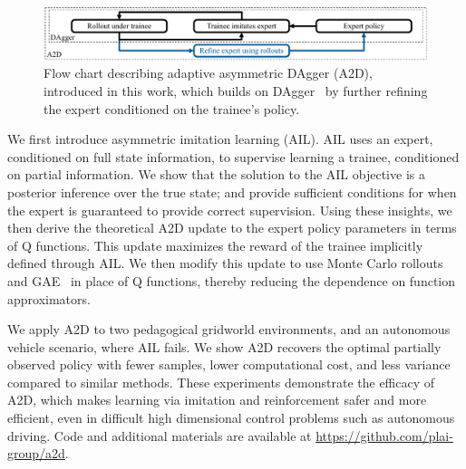 \begin{figure}
    \centering
    \includegraphics[width=\textwidth]{figures/ad_vs_a2d_super_simple.pdf}
    \vspace*{-0.3cm}
    \caption{Flow chart describing adaptive asymmetric DAgger (A2D), introduced in this work, which builds on DAgger~\citep{Ross2011} by further refining the expert conditioned on the trainee's policy. }
    \label{fig:a2d}
\end{figure}

We first introduce asymmetric imitation learning (AIL).  AIL uses an expert, conditioned on full state information, to supervise learning a trainee, conditioned on partial information.  We show that the solution to the AIL objective is a posterior inference over the true state; and provide sufficient conditions for when the expert is guaranteed to provide correct supervision.  Using these insights, we then derive the theoretical A2D update to the expert policy parameters in terms of Q functions.  This update maximizes the reward of the trainee implicitly defined through AIL.  We then modify this update to use Monte Carlo rollouts and GAE~\citep{schulman2015high} in place of Q functions, thereby reducing the dependence on function approximators. 

We apply A2D to two pedagogical gridworld environments, and an autonomous vehicle scenario, where AIL fails. We show A2D recovers the optimal partially observed policy with fewer samples, lower computational cost, and less variance compared to similar methods.  These experiments demonstrate the efficacy of A2D, which makes learning via imitation and reinforcement safer and more efficient, even in difficult high dimensional control problems such as autonomous driving. Code and additional materials are available at \url{https://github.com/plai-group/a2d}.
